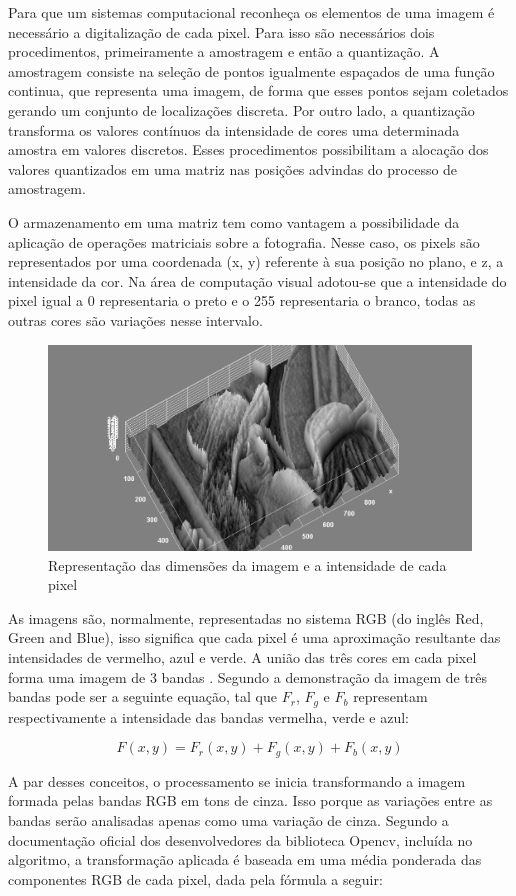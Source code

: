 \documentclass[a4paper,alpha-refs]{RBCA_v1.0}
\begin{document}
Para que um sistemas computacional reconheça os elementos de uma imagem é necessário a digitalização de cada pixel. Para isso são necessários dois procedimentos, primeiramente a amostragem e então a quantização. A amostragem consiste na seleção de pontos igualmente espaçados de uma função continua, que representa uma imagem, de forma que esses pontos sejam coletados gerando um conjunto de localizações discreta. Por outro lado, a quantização transforma os valores contínuos da intensidade de cores uma determinada amostra em valores discretos. Esses procedimentos possibilitam a alocação dos valores quantizados em uma matriz nas posições advindas do processo de amostragem. 

O armazenamento em uma matriz tem como vantagem a possibilidade da aplicação de operações matriciais sobre a fotografia. Nesse caso, os pixels são representados por uma coordenada (x, y) referente à sua posição no plano, e z, a intensidade da cor. Na área de computação visual adotou-se que a intensidade do pixel igual a 0 representaria o preto e o 255 representaria o branco, todas as outras cores são variações nesse intervalo. 

\begin{figure}[h!]
	\includegraphics[width=.5\textwidth]{img/img1.png}
	\caption{Representação das dimensões da imagem e a intensidade de cada pixel}
	\label{img:lena3d}
\end{figure}

As imagens são, normalmente, representadas no sistema RGB (do inglês Red, Green and Blue), isso significa que cada pixel é uma aproximação resultante das intensidades de vermelho, azul e verde. A união das três cores em cada pixel forma uma imagem de 3 bandas \citep{biasi2002desenvolvimento}. Segundo \cite{de2006introduccao} a demonstração da imagem de três bandas pode ser a seguinte equação, tal que $F_r$, $F_g$ e $F_b$ representam respectivamente a intensidade das bandas vermelha, verde e azul:

\begin{equation}
F(x,y)=F_r(x,y)+F_g(x,y)+F_b(x,y)
\end{equation}

A par desses conceitos, o processamento se inicia transformando a imagem formada pelas bandas RGB em tons de cinza. Isso porque as variações entre as bandas serão analisadas apenas como uma variação de cinza. Segundo a documentação oficial dos desenvolvedores da biblioteca Opencv, incluída no algoritmo, a transformação aplicada é baseada em uma média ponderada das componentes RGB de cada pixel, dada pela fórmula a seguir:
\end{document}
